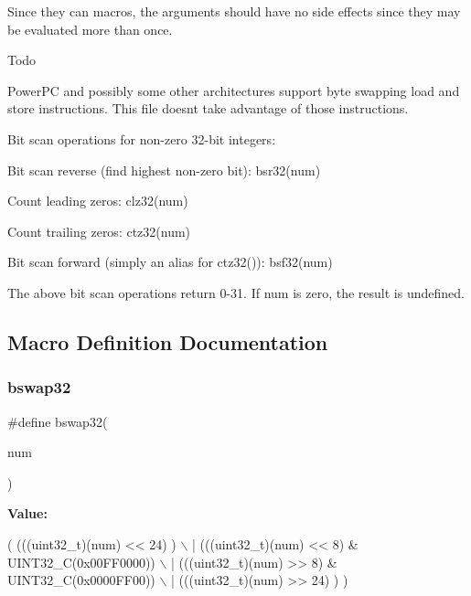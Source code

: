 Since they can macros, the arguments should have no side effects since they may be evaluated more than once.

\begin{DoxyRefDesc}{Todo}
\item[\textbf{ Todo}]Power\+PC and possibly some other architectures support byte swapping load and store instructions. This file doesn\textquotesingle{}t take advantage of those instructions.\end{DoxyRefDesc}


Bit scan operations for non-\/zero 32-\/bit integers\+:
\begin{DoxyItemize}
\item Bit scan reverse (find highest non-\/zero bit)\+: bsr32(num)
\item Count leading zeros\+: clz32(num)
\item Count trailing zeros\+: ctz32(num)
\item Bit scan forward (simply an alias for ctz32())\+: bsf32(num)
\end{DoxyItemize}

The above bit scan operations return 0-\/31. If num is zero, the result is undefined. 

\subsection{Macro Definition Documentation}
\mbox{\label{tuklib__integer_8h_a2610a88a071ec508edbc15ee90094e64}} 
\subsubsection{bswap32}
{\footnotesize\ttfamily \#define bswap32(\begin{DoxyParamCaption}\item[{}]{num }\end{DoxyParamCaption})}

{\bfseries Value\+:}
\begin{DoxyCode}
( (((uint32\_t)(num) << 24)                       ) \(\backslash\)
                | (((uint32\_t)(num) <<  8) & UINT32\_C(0x00FF0000)) \(\backslash\)
                | (((uint32\_t)(num) >>  8) & UINT32\_C(0x0000FF00)) \(\backslash\)
                | (((uint32\_t)(num) >> 24)                       ) )
\end{DoxyCode}
\mbox{\label{tuklib__integer_8h_ac9db02787e6a4bc63d62808b357df8ce}} 

